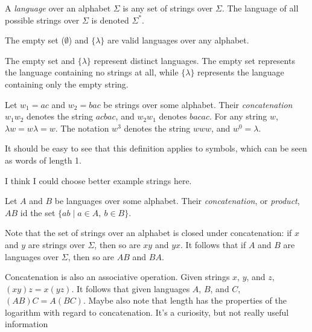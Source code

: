 \documentclass{bcthesis}
\renewcommand{\meo}{}
\begin{document}
		\begin{definition}[Language]
			A \textit{language} over an alphabet $\Sigma$ is any set of strings over $\Sigma$.
			The language of all possible strings over $\Sigma$ is denoted $\Sigma^*$.

			The empty set ($\emptyset$) and $\{ \lambda \}$ are valid languages over any alphabet.
		\end{definition}

		\begin{remark}
			The empty set and $\{ \lambda \}$ represent distinct languages. 
			The empty set represents the language containing no strings at all, while $\{ \lambda \}$ represents the language containing only the empty string.
		\end{remark}


\label{ch:regular_expressions}

	\begin{definition}[Concatenation]
		Let $w_1 = ac$ and $w_2 = bac$ be strings over some alphabet.
		Their \textit{concatenation} $w_1 w_2$ denotes the string $acbac$, and $w_2 w_1$ denotes $bacac$.
		For any string $w$, $\lambda w = w \lambda = w$.
		The notation $w^3$ denotes the string $www$, and $w^0 = \lambda$.

		It should be easy to see that this definition applies to symbols, which can be seen as words of length 1.

		\meo{I think I could choose better example strings here.}
	\end{definition}

	\begin{definition}
		Let $A$ and $B$ be languages over some alphabet.
		Their \textit{concatenation}, or \textit{product}, $AB$ id the set $\{ ab \mid a \in A, \ b \in B \}$.
	\end{definition}

	\begin{remark}
		Note that the set of strings over an alphabet is closed under concatenation: if $x$ and $y$ are strings over $\Sigma$, then so are $xy$ and $yx$.
		It follows that if $A$ and $B$ are languages over $\Sigma$, then so are $AB$ and $BA$.
		
		Concatenation is also an associative operation.
		Given strings $x$, $y$, and $z$, $(xy)z = x(yz)$.
		It follows that given languages $A$, $B$, and $C$, $(AB)C = A(BC)$.
		\meo{
			Maybe also note that length has the properties of the logarithm with regard to concatenation.
			It's a curiosity, but not really useful information
		}
	\end{remark}
\end{document}
